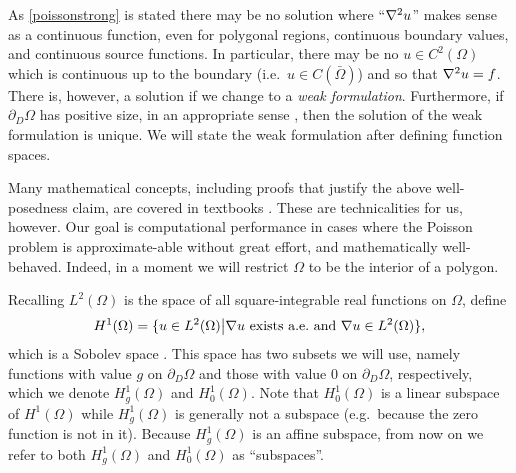 As \eqref{poissonstrong} is stated there may be no solution where ``$\nabla^2 u$'' makes sense as a continuous function, even for polygonal regions, continuous boundary values, and continuous source functions.  In particular, there may be no $u\in C^2(\Omega)$ which is continuous up to the boundary (i.e.~$u\in C(\bar\Omega)$) and so that $\nabla^2 u = f$.  There is, however, a solution if we change to a \emph{weak formulation}.  Furthermore, if $\partial_D \Omega$ has positive size, in an appropriate sense \citep[Theorem 1.2.1]{Ciarlet}, then the solution of the weak formulation is unique.  We will state the weak formulation after defining function spaces.

Many mathematical concepts, including proofs that justify the above well-posedness claim, are covered in textbooks \citep{Ciarlet,Evans}.  These are technicalities for us, however.  Our goal is computational performance in cases where the Poisson problem is approximate-able without great effort, and mathematically well-behaved.  Indeed, in a moment we will restrict $\Omega$ to be the interior of a polygon. 

Recalling $L^2(\Omega)$ is the space of all square-integrable real functions on $\Omega$, define
    $$H^1(\Omega) = \{u\in L^2(\Omega) \big| \nabla u \text{ exists a.e.~and } \nabla u \in L^2(\Omega)\},$$
which is a Sobolev space \citep{Evans}.  This space has two subsets we will use, namely functions with value $g$ on $\partial_D \Omega$ and those with value $0$ on $\partial_D \Omega$, respectively, which we denote $H_g^1(\Omega)$ and $H_0^1(\Omega)$.  Note that $H_0^1(\Omega)$ is a linear subspace of $H^1(\Omega)$ while $H_g^1(\Omega)$ is generally not a subspace (e.g.~because the zero function is not in it).  Because $H_g^1(\Omega)$ is an affine subspace, from now on we refer to both $H_g^1(\Omega)$ and $H_0^1(\Omega)$ as ``subspaces''.

